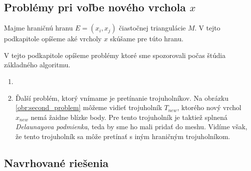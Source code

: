 \subsection{Problémy pri voľbe nového vrchola $x$}

Majme hraničnú hranu $E=(x_i, x_j)$ čiastočnej triangulácie $M$. 
V tejto podkapitole opíšeme aké vrcholy $x$ skúšame pre túto hranu. 

V tejto podkapitole opíšeme problémy ktoré sme spozorovali počas štúdia základného 
algoritmu.

\begin{enumerate}

\item{
    

   
}

\item{
    Ďalší problém, ktorý vnímame je pretínanie trojuholníkov. Na obrázku \ref{obr:second_problem} môžeme
    vidieť trojuholník $T_{new}$, ktorého nový vrchol $x_{new}$ nemá žaidne blízke body. 
    Pre tento trojuholník je taktiež splnená \textit{Delaunayova podmienka}, teda by sme ho mali pridať 
    do meshu. Vidíme však, že tento trojuholník sa môže pretínať s iným hraničným trojuholníkom.

    
}

\end{enumerate}
  
\subsection{Navrhované riešenia}

